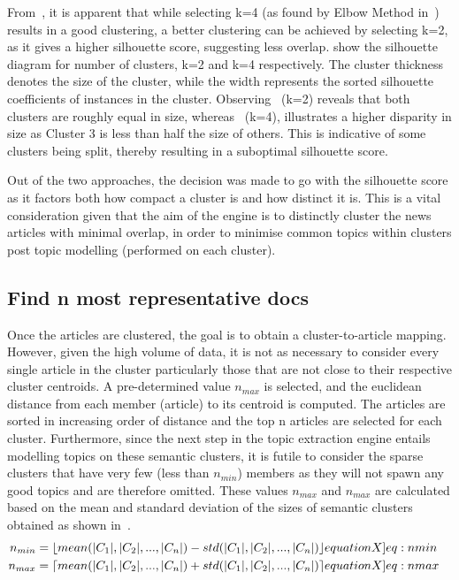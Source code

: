 \vspace{-1ex}
From~, it is apparent that while selecting k=4 (as found by Elbow Method in~) results in a good clustering, a better clustering can be achieved by selecting k=2, as it gives a higher silhouette score, suggesting less overlap.  show the silhouette diagram for number of clusters, k=2 and k=4 respectively. The cluster thickness denotes the size of the cluster, while the width represents the sorted silhouette coefficients of instances in the cluster. Observing~ (k=2) reveals that both clusters are roughly equal in size, whereas~ (k=4), illustrates a higher disparity in size as Cluster 3 is less than half the size of others. This is indicative of some clusters being split, thereby resulting in a suboptimal silhouette score. 

Out of the two approaches, the decision was made to go with the silhouette score as it factors both how compact a cluster is and how distinct it is. This is a vital consideration given that the aim of the engine is to distinctly cluster the news articles with minimal overlap, in order to minimise common topics within clusters post topic modelling (performed on each cluster). 

\subsection*{Find n most representative docs} \label{sec:Find_n_docs}

Once the articles are clustered, the goal is to obtain a cluster-to-article mapping. However, given the high volume of data, it is not as necessary to consider every single article in the cluster particularly those that are not close to their respective cluster centroids. A pre-determined value $n_{max}$ is selected, and the euclidean distance from each member (article) to its centroid is computed. The articles are sorted in increasing order of distance and the top n articles are selected for each cluster. Furthermore, since the next step in the topic extraction engine entails modelling topics on these semantic clusters, it is futile to consider the sparse clusters that have very few (less than $n_{min}$) members as they will not spawn any good topics and are therefore omitted. These values $n_{max}$ and $n_{max}$ are calculated based on the mean and standard deviation of the sizes of semantic clusters obtained as shown in~.
\vspace{-1px}
\begin{align}
  n_{min} &= \lfloor mean(|C_1|, |C_2|, ..., |C_n|) - std(|C_1|, |C_2|, ..., |C_n|) \rfloor \label[equationX]{eq:nmin} &\\
  n_{max} &= \lceil mean(|C_1|, |C_2|, ..., |C_n|) + std(|C_1|, |C_2|, ..., |C_n|) \rceil \label[equationX]{eq:nmax}
\end{align}

